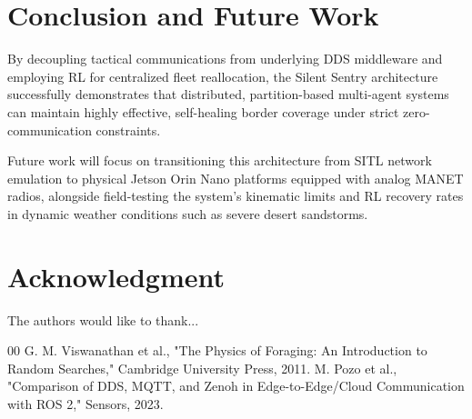 \documentclass[conference]{IEEEtran}
\begin{document}
\section{Conclusion and Future Work}
By decoupling tactical communications from underlying DDS middleware and employing RL for centralized fleet reallocation, the Silent Sentry architecture successfully demonstrates that distributed, partition-based multi-agent systems can maintain highly effective, self-healing border coverage under strict zero-communication constraints. 

Future work will focus on transitioning this architecture from SITL network emulation to physical Jetson Orin Nano platforms equipped with analog MANET radios, alongside field-testing the system's kinematic limits and RL recovery rates in dynamic weather conditions such as severe desert sandstorms.

\section*{Acknowledgment}
The authors would like to thank...

\begin{thebibliography}{00}
 G. M. Viswanathan et al., "The Physics of Foraging: An Introduction to Random Searches," Cambridge University Press, 2011.
 M. Pozo et al., "Comparison of DDS, MQTT, and Zenoh in Edge-to-Edge/Cloud Communication with ROS 2," Sensors, 2023.
\end{thebibliography}
\end{document}
